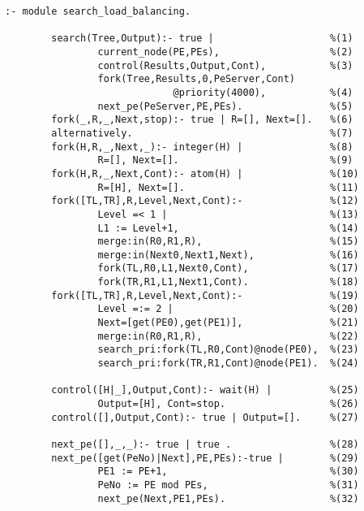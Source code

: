 \begin{verbatim}
:- module search_load_balancing.

        search(Tree,Output):- true |                    %(1)
                current_node(PE,PEs),                   %(2)
                control(Results,Output,Cont),           %(3)
                fork(Tree,Results,0,PeServer,Cont)
                             @priority(4000),           %(4)
                next_pe(PeServer,PE,PEs).               %(5)
        fork(_,R,_,Next,stop):- true | R=[], Next=[].   %(6)
        alternatively.                                  %(7)
        fork(H,R,_,Next,_):- integer(H) |               %(8)
                R=[], Next=[].                          %(9)
        fork(H,R,_,Next,Cont):- atom(H) |               %(10)
                R=[H], Next=[].                         %(11)
        fork([TL,TR],R,Level,Next,Cont):-               %(12)
                Level =< 1 |                            %(13)
                L1 := Level+1,                          %(14)
                merge:in(R0,R1,R),                      %(15)
                merge:in(Next0,Next1,Next),             %(16)
                fork(TL,R0,L1,Next0,Cont),              %(17)
                fork(TR,R1,L1,Next1,Cont).              %(18)
        fork([TL,TR],R,Level,Next,Cont):-               %(19)
                Level =:= 2 |                           %(20)
                Next=[get(PE0),get(PE1)],               %(21)
                merge:in(R0,R1,R),                      %(22)
                search_pri:fork(TL,R0,Cont)@node(PE0),  %(23)
                search_pri:fork(TR,R1,Cont)@node(PE1).  %(24)

        control([H|_],Output,Cont):- wait(H) |          %(25)
                Output=[H], Cont=stop.                  %(26)
        control([],Output,Cont):- true | Output=[].     %(27)
        
        next_pe([],_,_):- true | true .                 %(28)
        next_pe([get(PeNo)|Next],PE,PEs):-true |        %(29)
                PE1 := PE+1,                            %(30)
                PeNo := PE mod PEs,                     %(31)
                next_pe(Next,PE1,PEs).                  %(32)
\end{verbatim} 

